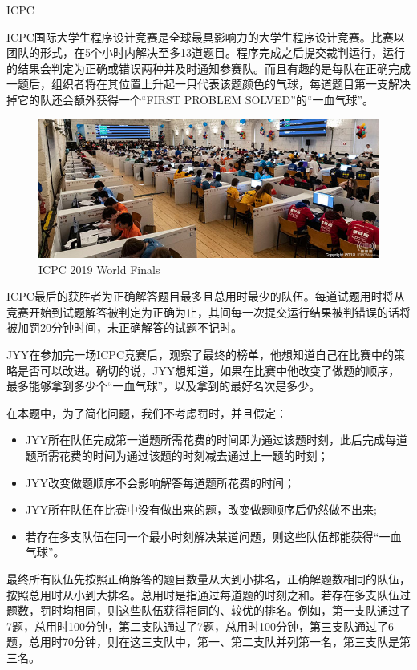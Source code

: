 \begin{Problem}{ICPC}{}

ICPC国际大学生程序设计竞赛是全球最具影响力的大学生程序设计竞赛。比赛以团队的形式，在5个小时内解决至多13道题目。程序完成之后提交裁判运行，运行的结果会判定为正确或错误两种并及时通知参赛队。而且有趣的是每队在正确完成一题后，组织者将在其位置上升起一只代表该题颜色的气球，每道题目第一支解决掉它的队还会额外获得一个“FIRST PROBLEM SOLVED”的“一血气球”。

\begin{figure}[h]
\centering
\includegraphics[width=12cm]{src/scoreboard/porto.jpg}
\caption{ICPC 2019 World Finals}
\end{figure}

ICPC最后的获胜者为正确解答题目最多且总用时最少的队伍。每道试题用时将从竞赛开始到试题解答被判定为正确为止，其间每一次提交运行结果被判错误的话将被加罚20分钟时间，未正确解答的试题不记时。

JYY在参加完一场ICPC竞赛后，观察了最终的榜单，他想知道自己在比赛中的策略是否可以改进。确切的说，JYY想知道，如果在比赛中他改变了做题的顺序，最多能够拿到多少个“一血气球”，以及拿到的最好名次是多少。

在本题中，为了简化问题，我们不考虑罚时，并且假定：
\begin{itemize}
\item JYY所在队伍完成第一道题所需花费的时间即为通过该题时刻，此后完成每道题所需花费的时间为通过该题的时刻减去通过上一题的时刻；
\item JYY改变做题顺序不会影响解答每道题所花费的时间；
\item JYY所在队伍在比赛中没有做出来的题，改变做题顺序后仍然做不出来;
\item 若存在多支队伍在同一个最小时刻解决某道问题，则这些队伍都能获得“一血气球”。
\end{itemize}

最终所有队伍先按照正确解答的题目数量从大到小排名，正确解题数相同的队伍，按照总用时从小到大排名。总用时是指通过每道题的时刻之和。若存在多支队伍过题数，罚时均相同，则这些队伍获得相同的、较优的排名。例如，第一支队通过了7题，总用时100分钟，第二支队通过了7题，总用时100分钟，第三支队通过了6题，总用时70分钟，则在这三支队中，第一、第二支队并列第一名，第三支队是第三名。


\end{Problem}
